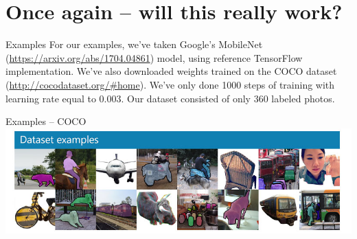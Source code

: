 \documentclass[aspectratio=1610,english]{beamer} %
\begin{document}
 \section{Once again -- will this really work?}
  	\begin{frame}{Examples}
		For our examples, we've taken Google's MobileNet (\url{https://arxiv.org/abs/1704.04861}) model, using reference TensorFlow implementation. We've also downloaded weights trained on the COCO dataset (\url{http://cocodataset.org/\#home}).\newline
		We've only done 1000 steps of training with learning rate equal to 0.003.\newline
		Our dataset consisted of only 360 labeled photos.
	\end{frame}
	\begin{frame}{Examples -- COCO}
		\includegraphics[scale=0.5]{images/coco-examples}
	\end{frame}
\end{document}
